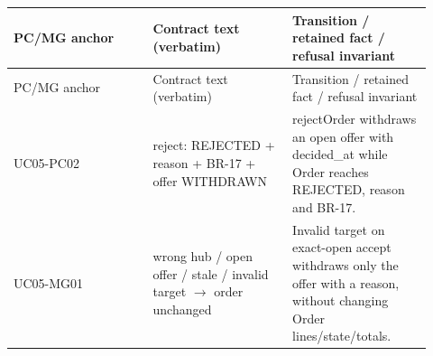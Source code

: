 \begin{longtable}{>{\raggedright\arraybackslash}p{0.3067\linewidth}>{\raggedright\arraybackslash}p{0.3067\linewidth}>{\raggedright\arraybackslash}p{0.3067\linewidth}}
PC/MG anchor & Contract text (verbatim) & Transition / retained fact / refusal invariant \\
\hline\endfirsthead
PC/MG anchor & Contract text (verbatim) & Transition / retained fact / refusal invariant \\
\hline\endhead
UC05-PC02 & reject: REJECTED + reason + BR-17 + offer WITHDRAWN & rejectOrder withdraws an open offer with decided\_at while Order reaches REJECTED, reason and BR-17. \\
UC05-MG01 & wrong hub / open offer / stale / invalid target \ensuremath{\rightarrow} order unchanged & Invalid target on exact-open accept withdraws only the offer with a reason, without changing Order lines/state/totals. \\
\end{longtable}
